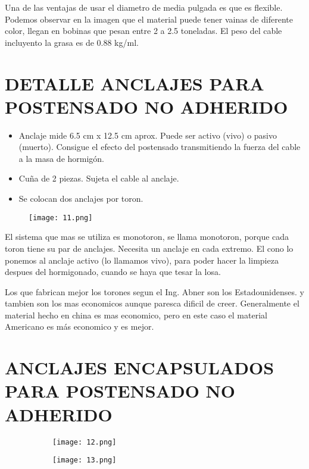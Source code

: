 Una de las ventajas de usar el diametro de media pulgada es que es flexible.
Podemos observar en la imagen que el material puede tener vainas de diferente
color, llegan en bobinas que pesan entre 2 a 2.5 toneladas.
El peso del cable incluyento la grasa es de 0.88 kg/ml.

\section{DETALLE ANCLAJES PARA POSTENSADO NO ADHERIDO}

\begin{itemize}
	\item {Anclaje mide 6.5 cm x 12.5 cm aprox. Puede ser activo (vivo)
	o pasivo (muerto). Consigue el efecto del postensado transmitiendo la 
	fuerza del cable a la masa de hormigón.}
	\item {Cuña de 2 piezas. Sujeta el cable al anclaje.}
	\item {Se colocan dos anclajes por toron.}
\end{itemize}

\begin{figure}[H]
\centering
\texttt{[image: 11.png]}
\end{figure}

El sistema que mas se utiliza es monotoron, se llama monotoron, porque
cada toron tiene su par de anclajes. Necesita un anclaje en cada extremo.
El cono lo ponemos al anclaje activo (lo llamamos vivo), para poder hacer
la limpieza despues del hormigonado, cuando se haya que tesar la losa.

Los que fabrican mejor los torones segun el Ing. Abner son los Estadounidenses.
y tambien son los mas economicos aunque paresca dificil de creer. Generalmente
el material hecho en china es mas economico, pero en este caso el material
Americano es más economico y es mejor.

\section{ANCLAJES ENCAPSULADOS PARA POSTENSADO NO ADHERIDO}

\begin{figure}[H]
	\begin{subfigure}{0.5\textwidth}
	\centering
	\texttt{[image: 12.png]}
	\end{subfigure}
	\begin{subfigure}{0.5\textwidth}
	\centering
	\texttt{[image: 13.png]}
	\end{subfigure}
\end{figure}

